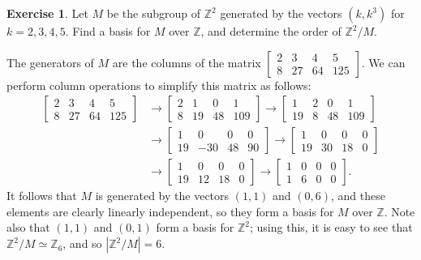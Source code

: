 \documentclass{amsart}
\newcommand{\bbm}       {\left[\begin{matrix}}
\newcommand{\ebm}       {\end{matrix}\right]}
\newcommand{\Z}         {{\mathbb{Z}}}
\newcommand{\xra}       {\xrightarrow}
\newcommand{\ip}[1]     {\langle #1\rangle}
\renewcommand{\:}{\colon}
\theoremstyle{definition}
\newtheorem{exercise}{Exercise}[section]
\renewenvironment{solution}{\SolutionAtEnd}{\endSolutionAtEnd}
\begin{document}
\begin{exercise}
 Let $M$ be the subgroup of $\Z^2$ generated by the vectors $(k,k^3)$
 for $k=2,3,4,5$.  Find a basis for $M$ over $\Z$, and determine the
 order of $\Z^2/M$.
\end{exercise}
\begin{solution}
 The generators of $M$ are the columns of the matrix
 $\bbm 2&3&4&5\\8&27&64&125 \ebm$.  We can perform column operations
 to simplify this matrix as follows:
 \begin{align*}
  \bbm 2&3&4&5\\8&27&64&125 \ebm &
   \xra{} \bbm 2&1&0&1 \\ 8&19&48&109 \ebm 
   \xra{} \bbm 1&2&0&1 \\ 19&8&48&109 \ebm  \\
  &\xra{} \bbm 1&0&0&0 \\ 19&-30&48&90 \ebm 
   \xra{} \bbm 1&0&0&0 \\ 19&30&18&0 \ebm  \\
  &\xra{} \bbm 1&0&0&0 \\ 19&12&18&0 \ebm 
   \xra{} \bbm 1&0&0&0 \\ 1&6&0&0 \ebm.
 \end{align*}
 It follows that $M$ is generated by the vectors $(1,1)$ and $(0,6)$,
 and these elements are clearly linearly independent, so they form a
 basis for $M$ over $\Z$.  Note also that $(1,1)$ and $(0,1)$ form a
 basis for $\Z^2$; using this, it is easy to see that
 $\Z^2/M\simeq\Z_6$, and so $|\Z^2/M|=6$.
\end{solution}
\end{document}
